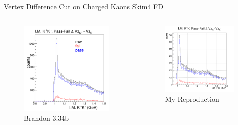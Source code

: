 \documentclass[aspectratio=169]{beamer}
\begin{document}
\begin{frame}{Vertex Difference Cut on Charged Kaons \hfill Skim4 FD}
\vspace*{-0.6cm}
    \begin{columns}
    \begin{figure}
        \centering
        \includegraphics[width=0.94\textwidth]{brandon_figs/34b.png}
        \caption{Brandon 3.34b}
    \end{figure}
    \begin{figure}
        \centering
        \includegraphics[width=0.97\textwidth]{pdfs/34b.png}
        \caption{My Reproduction}
    \end{figure}
    \end{columns}
\end{frame}
\end{document}
